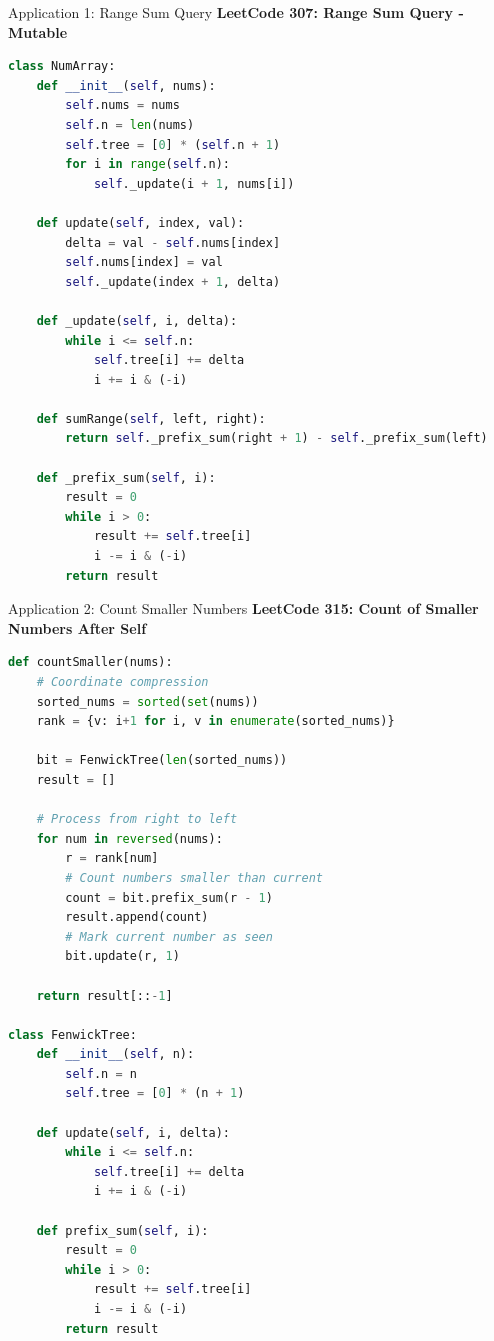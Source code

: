 \documentclass[aspectratio=169]{beamer}
\begin{document}
\begin{frame}[fragile]{Application 1: Range Sum Query}
  \textbf{LeetCode 307: Range Sum Query - Mutable}

  \begin{lstlisting}[language=Python, basicstyle=\ttfamily\footnotesize]
class NumArray:
    def __init__(self, nums):
        self.nums = nums
        self.n = len(nums)
        self.tree = [0] * (self.n + 1)
        for i in range(self.n):
            self._update(i + 1, nums[i])

    def update(self, index, val):
        delta = val - self.nums[index]
        self.nums[index] = val
        self._update(index + 1, delta)

    def _update(self, i, delta):
        while i <= self.n:
            self.tree[i] += delta
            i += i & (-i)

    def sumRange(self, left, right):
        return self._prefix_sum(right + 1) - self._prefix_sum(left)

    def _prefix_sum(self, i):
        result = 0
        while i > 0:
            result += self.tree[i]
            i -= i & (-i)
        return result
  \end{lstlisting}
\end{frame}

\begin{frame}[fragile]{Application 2: Count Smaller Numbers}
  \textbf{LeetCode 315: Count of Smaller Numbers After Self}

  \begin{lstlisting}[language=Python, basicstyle=\ttfamily\tiny]
def countSmaller(nums):
    # Coordinate compression
    sorted_nums = sorted(set(nums))
    rank = {v: i+1 for i, v in enumerate(sorted_nums)}

    bit = FenwickTree(len(sorted_nums))
    result = []

    # Process from right to left
    for num in reversed(nums):
        r = rank[num]
        # Count numbers smaller than current
        count = bit.prefix_sum(r - 1)
        result.append(count)
        # Mark current number as seen
        bit.update(r, 1)

    return result[::-1]

class FenwickTree:
    def __init__(self, n):
        self.n = n
        self.tree = [0] * (n + 1)

    def update(self, i, delta):
        while i <= self.n:
            self.tree[i] += delta
            i += i & (-i)

    def prefix_sum(self, i):
        result = 0
        while i > 0:
            result += self.tree[i]
            i -= i & (-i)
        return result
  \end{lstlisting}
\end{frame}
\end{document}
